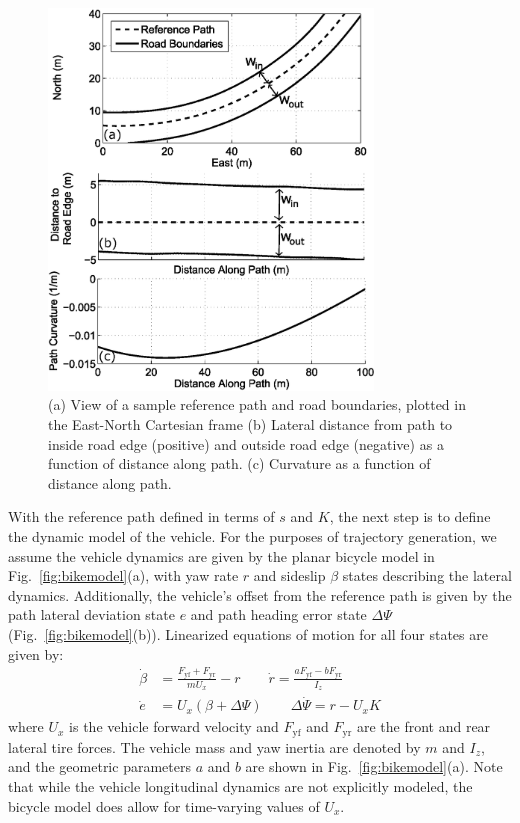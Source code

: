 \documentclass[twocolumn,10pt]{asme2ej}
\begin{document}
 \begin{figure}
\centering
\includegraphics[width=3.4in]{figures/worldInfo.eps}
\caption{(a) View of a sample reference path and road boundaries, plotted in the East-North Cartesian frame (b) Lateral distance from path to inside road edge (positive) and outside road edge (negative) as a function
of distance along path. (c) Curvature as a function of distance along path.}
\label{fig:worldInfo}
\end{figure}

With the reference path defined in terms of $s$ and $K$, the 
next step is to define the dynamic model of the vehicle. For the purposes of trajectory generation, we assume the vehicle dynamics are given 
by the planar bicycle model in Fig.~\ref{fig:bikemodel}(a), with yaw rate $r$ and sideslip $\beta$ states describing the lateral dynamics. Additionally, the vehicle's offset from
the reference path is given by the path lateral deviation state $e$ and path heading error state $\Delta\Psi$ (Fig.~\ref{fig:bikemodel}(b)). Linearized equations of
motion for all four states are given by:
\begin{subequations}
\label{eq:bm}
\begin{align}
	\dot{\beta} &= \frac{F_\mathrm{yf}+F_\mathrm{yr}}{mU_x} - r \qquad \dot{r} = \frac{aF_\mathrm{yf} - bF_\mathrm{yr}}{I_z} \label{bm1} \\
	\dot{e} &= U_x (\beta + \Delta\Psi) \qquad \Delta\dot{\Psi} = r - U_xK \label{eq:bm2} 
\end{align}
\end{subequations}
where $U_x$ is the vehicle forward velocity and $F_\mathrm{yf}$ and $F_\mathrm{yr}$ are the front and rear lateral tire forces. 
The vehicle mass and yaw inertia are denoted by $m$ and $I_z$, and the geometric parameters $a$ and $b$ are shown in Fig.~\ref{fig:bikemodel}(a). Note
that while the vehicle longitudinal dynamics are not explicitly modeled, the bicycle model does allow for time-varying values of $U_x$.
\end{document}
